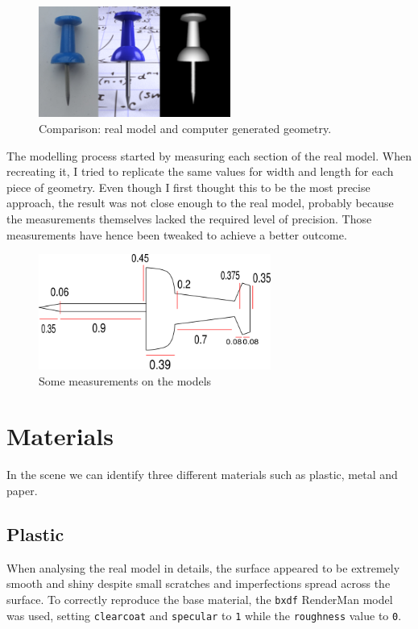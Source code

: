 \documentclass[tog]{acmsiggraph}
\begin{document}
\begin{figure}[h]
  \centering
  \includegraphics[width=6.3cm]{images/modelling.png}
  \caption{Comparison: real model and computer generated geometry.}
  \label{fig:modelling}
\end{figure}

\vspace{1.0cm}
The modelling process started by measuring each section of the real model. When recreating it, I tried to replicate the same values for width and length for each piece of geometry. Even though I first thought this to be the most precise approach, the result was not close enough to the real model, probably because the measurements themselves lacked the required level of precision.
Those measurements have hence been tweaked to achieve a better outcome.

\begin{figure}[h!]
  \centering
  \includegraphics[width=3.0in]{images/measurements.png}
  \caption{Some measurements on the models}
  \label{fig:measurements}
\end{figure}

\newpage
\section{Materials}

In the scene we can identify three different materials such as plastic, metal and paper.

\subsection{Plastic}
When analysing the real model in details, the surface appeared to be extremely smooth and shiny despite small scratches and imperfections spread across the surface. To correctly reproduce the base material, the \texttt{bxdf} RenderMan model was used, setting \texttt{clearcoat} and \texttt{specular} to \texttt{1} while the \texttt{roughness} value to \texttt{0}.
\end{document}
